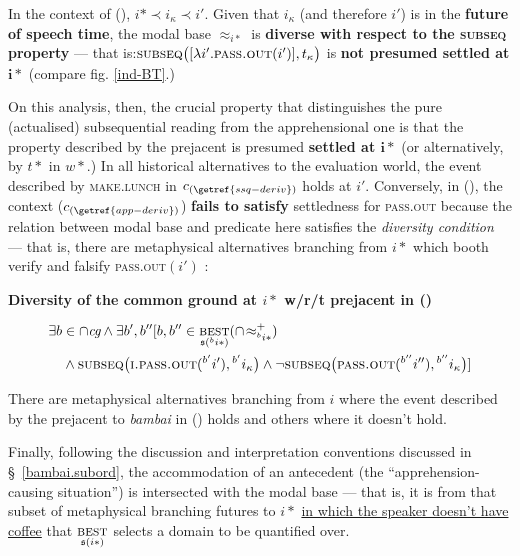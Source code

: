 \xe


In the context of (), $ i*\prec i_\kappa\prec i' $. Given that $ i_\kappa $ (and therefore $ i' $) is in the \textbf{future of speech time}, the modal base $ \approx_{i*} $ is \textbf{diverse with respect to the \textsc{subseq} property} --- that is:\linebreak$ \textsc{subseq}\big([\lambda i'.\textsc{pass.out}(i')],t_\kappa\big) $ is \textbf{not presumed settled at $ \boldsymbol{i*} $} (compare fig. \ref{ind-BT}.)


On this analysis, then, the crucial property that distinguishes the pure (actualised) subsequential reading from the apprehensional one is that the property described by the prejacent is presumed \textbf{settled at $ \boldsymbol{i*}$} (or alternatively, by $ t* $ in $ w* $.) In all historical alternatives to the evaluation world, the event described by \textsc{make.lunch} in $ c_{(\getref{ssq-deriv})}$ holds at $ i' $. Conversely, in (), the context ($ c_{(\getref{app-deriv})} $) \textbf{fails to satisfy} settledness for \textsc{pass.out} because the relation between modal base and predicate here satisfies the \textit{diversity condition} --- that is, there are metaphysical alternatives branching from $ i* $ which booth verify and falsify \textsc{pass.out}$ (i') $ \citep[\textit{cf.}][83]{Condoravdi2002}:

\pex \textbf{Diversity of the common ground at $ i* $ w/r/t prejacent in ()}


$$ \begin{multlined}\exists b\in\cap\textit{cg}\wedge\exists b',b''[b,b''\in\underset{\mathfrak s(^bi*)}{\textsc{best}}(\cap\!\approx^+_{^bi*})\\\wedge\textsc{subseq}\big(\textsc{i.pass.out}(^{b'}i'),{}^{b'}i_\kappa\big)\wedge\neg\textsc{subseq}\big(\textsc{pass.out}(^{b''}i''),{}^{b''}i_\kappa\big)]\end{multlined}$$ 

There are metaphysical alternatives branching from $ i $ where the event described by the prejacent to \textit{bambai} in () holds and others where it doesn't hold.
\xe

\noindent Finally, following the discussion and interpretation conventions discussed in \S~\ref{bambai.subord}, the accommodation of an antecedent (the ``apprehension-causing situation'') is intersected with the modal base --- that is, it is from that subset of metaphysical branching futures to $ i* $ \ul{in which the speaker doesn't have coffee} that $ \underset{\mathfrak s(i*)}{\textsc{best}} $ selects a domain to be quantified over.%

